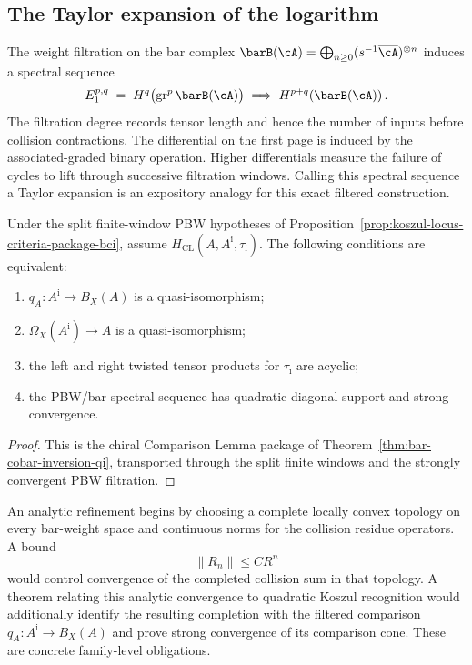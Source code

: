\subsection{The Taylor expansion of the logarithm}
\label{subsec:taylor-expansion-log}

The weight filtration on the bar complex
$\barB(\cA) = \bigoplus_{n \geq 0} (s^{-1}\overline{\cA})^{\otimes n}$
induces a spectral sequence
\[
E_1^{p,q} \;=\; H^q\bigl(\mathrm{gr}^p\, \barB(\cA)\bigr)
\;\Longrightarrow\;
H^{p+q}(\barB(\cA))\,.
\]
The filtration degree records tensor length and hence the number of
inputs before collision contractions.  The differential on the first
page is induced by the associated-graded binary operation.  Higher
differentials measure the failure of cycles to lift through successive
filtration windows.  Calling this spectral sequence a Taylor expansion
is an expository analogy for this exact filtered construction.

\begin{proposition}
\label{prop:log-convergence}
Under the split finite-window PBW hypotheses of
Proposition~\ref{prop:koszul-locus-criteria-package-bci}, assume
$H_{\mathrm{CL}}(A,A^{\mathrm i},\tau_{\mathrm i})$.  The following
conditions are equivalent:
\begin{enumerate}[label=(\roman*)]
\item $q_A\colon A^{\mathrm i}\to B_X(A)$ is a quasi-isomorphism;
\item $\Omega_X(A^{\mathrm i})\to A$ is a quasi-isomorphism;
\item the left and right twisted tensor products for
$\tau_{\mathrm i}$ are acyclic;
\item the PBW/bar spectral sequence has quadratic diagonal support and
strong convergence.
\end{enumerate}
\end{proposition}

\begin{proof}
This is the chiral Comparison Lemma package of
Theorem~\ref{thm:bar-cobar-inversion-qi}, transported through the
split finite windows and the strongly convergent PBW filtration.
\end{proof}

\begin{remark}
\label{rem:convergence-radius-ope}
An analytic refinement begins by choosing a complete locally convex
topology on every bar-weight space and continuous norms for the
collision residue operators.  A bound
\[
 \lVert R_n\rVert\leq CR^n
\]
would control convergence of the completed collision sum in that
topology.  A theorem relating this analytic convergence to quadratic
Koszul recognition would additionally identify the resulting
completion with the filtered comparison
$q_A\colon A^{\mathrm i}\to B_X(A)$ and prove strong convergence of
its comparison cone.  These are concrete family-level obligations.
\end{remark}

